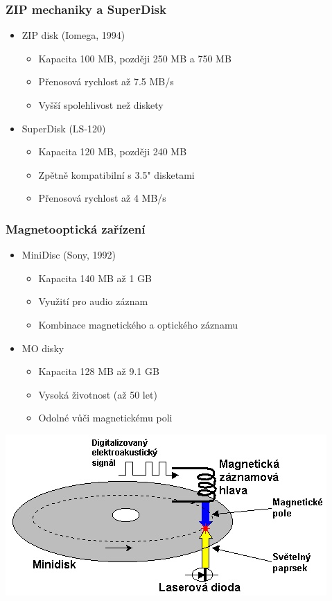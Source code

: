 \documentclass[aspectratio=43]{beamer}
\begin{document}
\begin{frame}
\frametitle{ZIP mechaniky a SuperDisk}
\begin{itemize}
\item ZIP disk (Iomega, 1994)
  \begin{itemize}
  \item Kapacita 100 MB, později 250 MB a 750 MB
  \item Přenosová rychlost až 7.5 MB/s
  \item Vyšší spolehlivost než diskety
  \end{itemize}
\item SuperDisk (LS-120)
  \begin{itemize}
  \item Kapacita 120 MB, později 240 MB
  \item Zpětně kompatibilní s 3.5" disketami
  \item Přenosová rychlost až 4 MB/s
  \end{itemize}
\end{itemize}
\end{frame}

\begin{frame}
\frametitle{Magnetooptická zařízení}
\begin{itemize}
\item MiniDisc (Sony, 1992)
  \begin{itemize}
  \item Kapacita 140 MB až 1 GB
  \item Využití pro audio záznam
  \item Kombinace magnetického a optického záznamu
  \end{itemize}
\item MO disky
  \begin{itemize}
  \item Kapacita 128 MB až 9.1 GB
  \item Vysoká životnost (až 50 let)
  \item Odolné vůči magnetickému poli
  \end{itemize}
\end{itemize}

\begin{center}
        \includegraphics[width=0.65\linewidth]{extrahovane_obrazky/minidisk.jpg}
    \end{center}
\end{frame}
\end{document}
